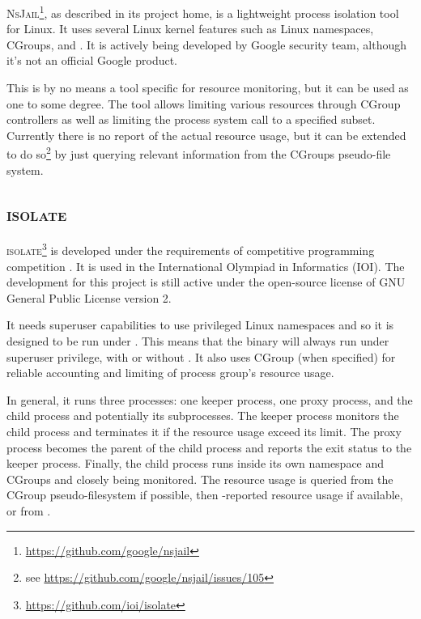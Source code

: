 \textsc{NsJail}\footnote{\href{https://github.com/google/nsjail}{https://github.com/google/nsjail}}, as described in its project home, is a lightweight process isolation tool for Linux.
It uses several Linux kernel features such as Linux namespaces, CGroups, and .
It is actively being developed by Google security team, although it's not an official Google product.

This is by no means a tool specific for resource monitoring, but it can be used as one to some degree.
The tool allows limiting various resources through CGroup controllers as well as limiting the process system call to a specified subset.
Currently there is no report of the actual resource usage, but it can be extended to do so\footnote{see \href{https://github.com/google/nsjail/issues/105}{https://github.com/google/nsjail/issues/105}} by just querying relevant information from the CGroups pseudo-file system.


\subsection{\textsc{isolate}}

\textsc{isolate}\footnote{\href{https://github.com/ioi/isolate}{https://github.com/ioi/isolate}} is developed under the requirements of competitive programming competition \citep{marevs2012new}.
It is used in the International Olympiad in Informatics (IOI).
The development for this project is still active under the open-source license of GNU General Public License version 2.

It needs superuser capabilities to use privileged Linux namespaces and so it is designed to be run under .
This means that the binary will always run under superuser privilege, with or without .
It also uses CGroup (when specified) for reliable accounting and limiting of process group's resource usage.

In general, it runs three processes: one keeper process, one proxy process, and the child process and potentially its subprocesses.
The keeper process monitors the child process and terminates it if the resource usage exceed its limit.
The proxy process becomes the parent of the child process and reports the exit status to the keeper process.
Finally, the child process runs inside its own namespace and CGroups and closely being monitored.
The resource usage is queried from the CGroup pseudo-filesystem if possible, then -reported resource usage if available, or from .


